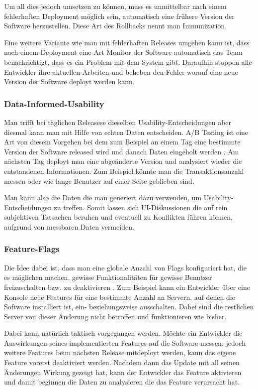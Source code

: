 Um all dies jedoch umsetzen zu können, muss es unmittelbar nach einem fehlerhaften Deployment möglich sein, automatisch eine frühere Version der Software herzustellen. Diese Art des Rollbacks nennt man Immunization.

Eine weitere Variante wie man mit fehlerhaften Releases umgehen kann ist, dass nach einem Deployment eine Art Monitor der Software automatisch das Team benachrichtigt, dass es ein Problem mit dem System gibt. Daraufhin stoppen alle Entwickler ihre aktuellen Arbeiten und beheben den Fehler worauf eine neue Version der Software deployt werden kann.

\subsubsection{Data-Informed-Usability}
Man trifft bei täglichen Releasese dieselben Usability-Ent\-schei\-dun\-gen aber diesmal kann man mit Hilfe von echten Daten entscheiden. A/B Testing ist eine Art von diesem Vorgehen bei dem zum Beispiel an einem Tag eine bestimmte Version der Software released wird und danach Daten eingeholt werden \cite{webanalytics2009}. Am nächsten Tag deployt man eine abgeänderte Version und analysiert wieder die entstandenen Informationen. Zum Beispiel könnte man die Transaktionsanzahl messen oder wie lange Benutzer auf einer Seite geblieben sind. 

Man kann also die Daten die man generiert dazu verwenden, um Usability-Ent\-schei\-dun\-gen zu treffen. Somit lassen sich UI-Diskussionen die auf rein subjektiven Tatsachen beruhen und eventuell zu Konflikten führen können, aufgrund von messbaren Daten vermeiden.

\subsubsection{Feature-Flags}
\label{minisec:featureflags}
Die Idee dabei ist, dass man eine globale Anzahl von Flags konfiguriert hat, die es möglichen machen, gewisse Funktionalitäten für gewisse Benutzer freizuschalten bzw. zu deaktivieren \cite{weboperations2010}. Zum Beispiel kann ein Entwickler über eine Konsole neue Features für eine bestimmte Anzahl an Servern, auf denen die Software installiert ist, ein- beziehungsweise ausschalten. Dabei sind die restlichen Server von dieser Änderung nicht betroffen und funktionieren wie bisher.

Dabei kann natürlich taktisch vorgegangen werden. Möchte ein Entwickler die Auswirkungen seines implementierten Features auf die Software messen, jedoch weitere Features beim nächsten Release mitdeployt werden, kann das eigene Feature vorerst deaktiviert werden. Nachdem dann das Update mit all seinen Änderungen Wirkung gezeigt hat, kann der Entwickler das Feature aktivieren und damit beginnen die Daten zu analysieren die das Feature verursacht hat. 

